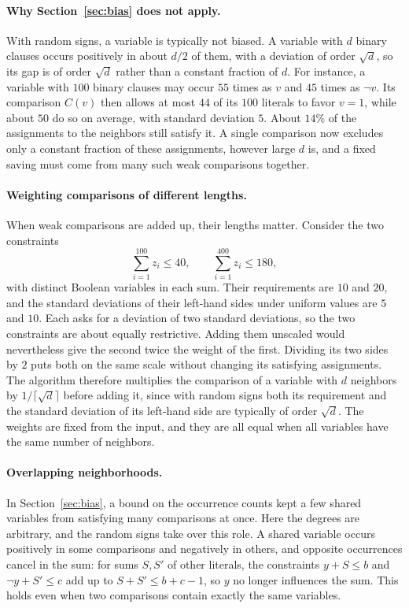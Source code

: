 \documentclass[11pt,a4paper]{article}
\theoremstyle{definition}
\theoremstyle{remark}
\begin{document}
\paragraph{Why Section~\ref{sec:bias} does not apply.}
With random signs, a variable is typically not biased. A variable with $d$
binary clauses occurs positively in about $d/2$ of them, with a deviation
of order $\sqrt d$, so its gap is of order $\sqrt d$ rather than a constant
fraction of $d$. For instance, a variable with $100$ binary clauses may
occur $55$ times as $v$ and $45$ times as $\neg v$. Its comparison $C(v)$
then allows at most $44$ of its $100$ literals to favor $v=1$, while about
$50$ do so on average, with standard deviation $5$. About $14\%$ of the
assignments to the neighbors still satisfy it. A single comparison now
excludes only a constant fraction of these assignments, however large $d$
is, and a fixed saving must come from many such weak comparisons together.

\paragraph{Weighting comparisons of different lengths.}
When weak comparisons are added up, their lengths matter. Consider the two
constraints
\[
 \sum_{i=1}^{100}z_i\le40,\qquad
 \sum_{i=1}^{400}z_i\le180,
\]
with distinct Boolean variables in each sum. Their requirements are $10$
and $20$, and the standard deviations of their left-hand sides under
uniform values are $5$ and $10$. Each asks for a deviation of two standard
deviations, so the two constraints are about equally restrictive. Adding
them unscaled would nevertheless give the second twice the weight of the
first. Dividing its two sides by $2$ puts both on the same scale without
changing its satisfying assignments. The algorithm therefore multiplies
the comparison of a variable with $d$ neighbors by
$1/\lceil\sqrt d\rceil$ before adding it, since with random signs both its
requirement and the standard deviation of its left-hand side are typically
of order $\sqrt d$. The weights are fixed from the input, and they are all
equal when all variables have the same number of neighbors.

\paragraph{Overlapping neighborhoods.}
In Section~\ref{sec:bias}, a bound on the occurrence counts kept a few
shared variables from satisfying many comparisons at once. Here the degrees
are arbitrary, and the random signs take over this role. A shared variable
occurs positively in some comparisons and negatively in others, and
opposite occurrences cancel in the sum: for sums $S,S'$ of other literals,
the constraints $y+S\le b$ and $\neg y+S'\le c$ add up to $S+S'\le b+c-1$, so
$y$ no longer influences the sum. This holds even when two comparisons
contain exactly the same variables.
\end{document}
